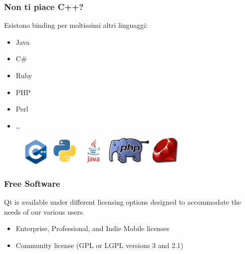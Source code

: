 \documentclass{beamer}
\begin{document}
\begin{frame}
	\frametitle{Non ti piace C++?}
	\begin{block}{}
		Esistono binding per moltissimi altri linguaggi:
		\begin{itemize}
			\item Java
			\item C\#
			\item Ruby
			\item PHP
			\item Perl
			\item \dots
		\end{itemize}
	\end{block}
	\vspace{0.5cm}
	\begin{figure}
		\includegraphics[height=1.4cm]{images/cplusplus.png}
		\qquad
		\includegraphics[height=1.4cm]{images/python.png}
		\qquad
		\includegraphics[height=1.4cm]{images/java.png}
		\qquad
		\includegraphics[height=1.4cm]{images/php.png}
		\qquad
		\includegraphics[height=1.4cm]{images/ruby.png}
	\end{figure}	
\end{frame}

\begin{frame}
	\frametitle{Free Software}
	Qt is available under different licensing options designed to accommodate the needs of our various users.
	\begin{itemize}
		\item Enterprise, Professional, and Indie Mobile licenses
		\item Community license (GPL or LGPL versions 3 and 2.1)
	\end{itemize}
\end{frame}
\end{document}
